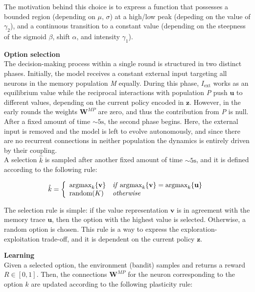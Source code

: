 \noindent The motivation behind this choice is to express a function that possesses a bounded region (depending on $\mu,\,\sigma$) at a high/low peak (depeding on the value of $\gamma_{2}$), and a continuous transition to a constant value (depending on the steepness of the sigmoid $\beta$, shift
$\alpha$, and intensity $\gamma_{1}$).

\hfill \break
\textbf{Option selection} \\
The decision-making process within a single round is structured in two distinct phases. Initially, the model receives a constant external input targeting all neurons in the memory population \textit{M} equally.
During this phase, $I_{\text{ext}}$ works as an equilibrium value while the reciprocal interactions with population \textit{P} push $\textbf{u}$ to different values, depending on the current policy encoded in $\textbf{z}$. However, in the early rounds the weights $\textbf{W}^{MP}$ are zero, and thus
the contribution from \textit{P} is null. After a fixed amount of time $\sim 5 \text{s}$, the second phase begins. Here, the external input is removed and the model is left to evolve autonomously, and since there are no recurrent connections in neither population the dynamics is entirely driven by their coupling. \\
A selection $\hat{k}$ is sampled after another fixed amount of time $\sim 5 \text{s}$, and it is defined according to the following rule:

\begin{equation*}
    \hat{k} =
    \left\{
        \begin{array}{ll}
            \text{argmax}_{k}\{\textbf{v}\} & \text{\textit{if}}\; \text{argmax}_{k} \{\textbf{v}\} = \text{argmax}_{k} \{\textbf{u}\} \\
            \text{random}(K) & \text{\textit{otherwise}}
        \end{array}
    \right.
\end{equation*}

\noindent The selection rule is simple: if the value representation $\textbf{v}$ is in agreement with the memory trace $\textbf{u}$, then the option with the highest value is selected. Otherwise, a random option is chosen. This rule is a way to express the exploration-exploitation trade-off, and it is dependent on the current policy $\textbf{z}$.

\hfill \break
\textbf{Learning} \\
Given a selected option, the environment (bandit) samples and returns a reward $R\in [0, 1]$.
Then, the connections $\textbf{W}^{MP}$ for the neuron corresponding to the option $k$ are updated according to the following plasticity rule:

